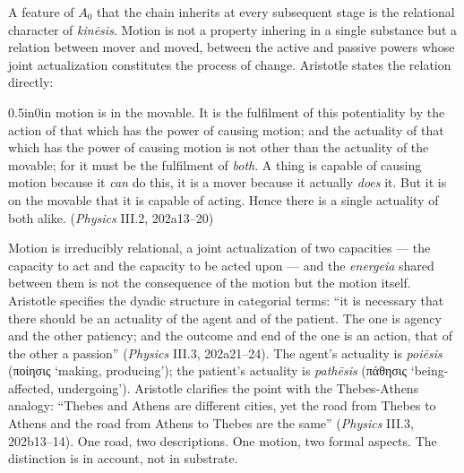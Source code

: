 \documentclass{article}
\newcommand{\gk}[1]{{\greekfont #1}}
\begin{document}
A feature of $A_0$ that the chain inherits at every subsequent stage is the relational character of \textit{kinēsis}. Motion is not a property inhering in a single substance but a relation between mover and moved, between the active and passive powers whose joint actualization constitutes the process of change. Aristotle states the relation directly:
\begin{adjustwidth}{0.5in}{0in}
motion is in the movable. It is the fulfilment of this potentiality by the action of that which has the power of causing motion; and the actuality of that which has the power of causing motion is not other than the actuality of the movable; for it must be the fulfilment of \textit{both}. A thing is capable of causing motion because it \textit{can} do this, it is a mover because it actually \textit{does} it. But it is on the movable that it is capable of acting. Hence there is a single actuality of both alike. (\textit{Physics} III.2, 202a13--20)
\end{adjustwidth}
Motion is irreducibly relational, a joint actualization of two capacities --- the capacity to act and the capacity to be acted upon --- and the \textit{energeia} shared between them is not the consequence of the motion but the motion itself. Aristotle specifies the dyadic structure in categorial terms: ``it is necessary that there should be an actuality of the agent and of the patient. The one is agency and the other patiency; and the outcome and end of the one is an action, that of the other a passion'' (\textit{Physics} III.3, 202a21--24). The agent's actuality is \textit{poiēsis} (\gk{ποίησις} `making, producing'); the patient's actuality is \textit{pathēsis} (\gk{πάθησις} `being-affected, undergoing'). Aristotle clarifies the point with the Thebes-Athens analogy: ``Thebes and Athens are different cities, yet the road from Thebes to Athens and the road from Athens to Thebes are the same'' (\textit{Physics} III.3, 202b13--14). One road, two descriptions. One motion, two formal aspects. The distinction is in account, not in substrate.
\end{document}
